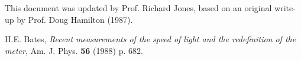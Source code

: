 \documentclass{revtex4}
\begin{document}

\begin{acknowledgments}
This document was updated by Prof. Richard Jones, based on an original
write-up by Prof. Doug Hamilton (1987).
\end{acknowledgments}

%

\begin{thebibliography}{9}

H.E. Bates, {\em Recent measurements of the speed of light and the
redefinition of the meter}, Am.  J. Phys. {\bf 56} (1988) p. 682.
\end{thebibliography}
\end{document}
